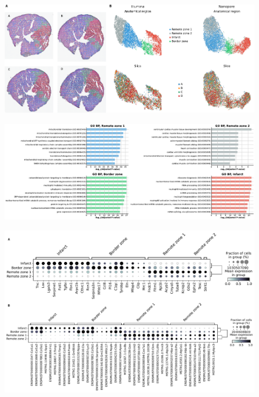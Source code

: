 \documentclass[utf8]{frontiers_suppmat} %
\begin{document}
\begin{figure}[htbp]
\begin{center}
\includegraphics[width=\textwidth]{figS5}%
\end{center}
\caption{}\label{fig:S5}
\end{figure}

\begin{figure}[htbp]
\begin{center}
\includegraphics[width=\textwidth]{figS6}%
\end{center}
\caption{}\label{fig:S6}
\end{figure}

\begin{figure}[htbp]
\begin{center}
\includegraphics[width=\textwidth]{figS7}%
\end{center}
\caption{}\label{fig:S7}
\end{figure}
\end{document}
